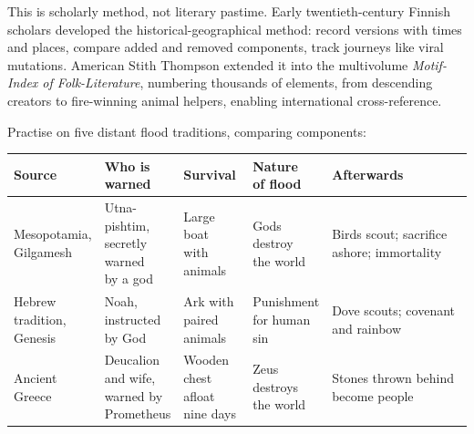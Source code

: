 This is scholarly method, not literary pastime. Early twentieth-century Finnish scholars developed the historical-geographical method: record versions with times and places, compare added and removed components, track journeys like viral mutations. American Stith Thompson extended it into the multivolume \textit{Motif-Index of Folk-Literature}, numbering thousands of elements, from descending creators to fire-winning animal helpers, enabling international cross-reference.

Practise on five distant flood traditions, comparing components:

\noindent
\begin{tabularx}{\linewidth}{llllX}
\toprule
Source & \shortstack[l]{Who is\\ warned} & Survival & \shortstack[l]{Nature\\ of flood} & Afterwards \\
\midrule
\shortstack[l]{Mesopotamia,\\ Gilgamesh} & \shortstack[l]{Utna-\\ pishtim,\\ secretly\\ warned\\ by a god} & \shortstack[l]{Large boat\\ with\\ animals} & \shortstack[l]{Gods\\ destroy\\ the world} & Birds scout; sacrifice ashore; immortality \\
\shortstack[l]{Hebrew\\ tradition,\\ Genesis} & \shortstack[l]{Noah,\\ instructed\\ by God} & \shortstack[l]{Ark with\\ paired\\ animals} & \shortstack[l]{Punishment\\ for human\\ sin} & Dove scouts; covenant and rainbow \\
\shortstack[l]{Ancient\\ Greece} & \shortstack[l]{Deucalion\\ and wife,\\ warned by\\ Prometheus} & \shortstack[l]{Wooden\\ chest afloat\\ nine days} & \shortstack[l]{Zeus\\ destroys\\ the world} & Stones thrown behind become people \\
\bottomrule
\end{tabularx}

